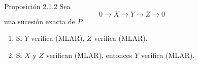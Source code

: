 \begin{statement}{Proposición 2.1.2}
Sea
\[
0\longrightarrow X\longrightarrow Y\longrightarrow Z\longrightarrow0
\]
una sucesión exacta de $P$.
\begin{enumerate}[label=(\roman*)]
\item Si $Y$ verifica (MLAR), $Z$ verifica (MLAR).
\item Si $X$ y $Z$ verifican (MLAR), entonces $Y$ verifica (MLAR).
\end{enumerate}
\end{statement}
